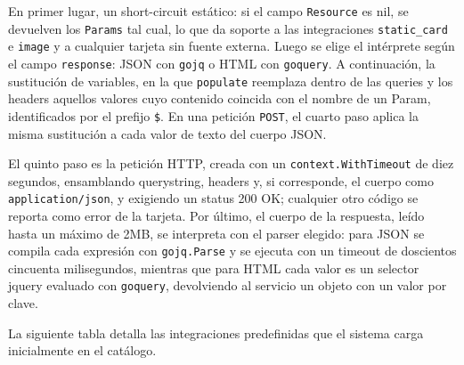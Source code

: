 En primer lugar, un short-circuit estático: si el campo \texttt{Resource} es nil, se devuelven los \texttt{Params} tal cual, lo que da soporte a las integraciones \texttt{static\_card} e \texttt{image} y a cualquier tarjeta sin fuente externa. Luego se elige el intérprete según el campo \texttt{response}: JSON con \texttt{gojq} o HTML con \texttt{goquery}. A continuación, la sustitución de variables, en la que \texttt{populate} reemplaza dentro de las queries y los headers aquellos valores cuyo contenido coincida con el nombre de un Param, identificados por el prefijo \texttt{\$}. En una petición \texttt{POST}, el cuarto paso aplica la misma sustitución a cada valor de texto del cuerpo JSON.

El quinto paso es la petición HTTP, creada con un \texttt{context.WithTimeout} de diez segundos, ensamblando querystring, headers y, si corresponde, el cuerpo como \texttt{application/json}, y exigiendo un status 200 OK; cualquier otro código se reporta como error de la tarjeta. Por último, el cuerpo de la respuesta, leído hasta un máximo de 2MB, se interpreta con el parser elegido: para JSON se compila cada expresión con \texttt{gojq.Parse} y se ejecuta con un timeout de doscientos cincuenta milisegundos, mientras que para HTML cada valor es un selector jquery evaluado con \texttt{goquery}, devolviendo al servicio un objeto con un valor por clave.

La siguiente tabla detalla las integraciones predefinidas que el sistema carga inicialmente en el catálogo.


